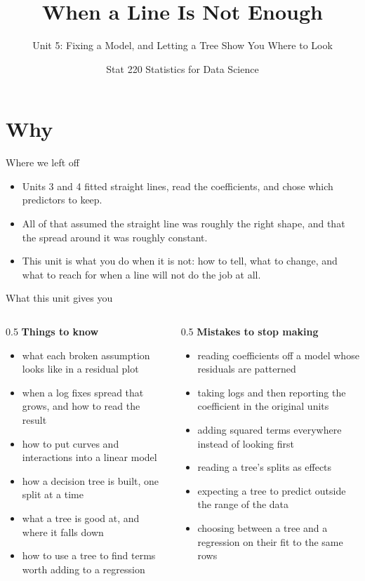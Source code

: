 \documentclass[aspectratio=169]{beamer}
\title{When a Line Is Not Enough}
\subtitle{Unit 5: Fixing a Model, and Letting a Tree Show You Where to Look}
\author{Stat 220 \textbar{} Statistics for Data Science}
\date{}
\begin{document}
\begin{frame}
  \titlepage
\end{frame}

\section{Why}
\begin{frame}{Where we left off}
\begin{itemize}
  \item Units 3 and 4 fitted straight lines, read the coefficients, and chose which predictors
        to keep.
  \item All of that assumed the straight line was roughly the right shape, and that the spread
        around it was roughly constant.
  \item This unit is what you do when it is not: how to tell, what to change, and what to reach
        for when a line will not do the job at all.
\end{itemize}
\end{frame}

\begin{frame}{What this unit gives you}
\begin{columns}[T]
\begin{column}{0.5\textwidth}
\textbf{Things to know}
\begin{itemize}\small
  \item what each broken assumption looks like in a residual plot
  \item when a log fixes spread that grows, and how to read the result
  \item how to put curves and interactions into a linear model
  \item how a decision tree is built, one split at a time
  \item what a tree is good at, and where it falls down
  \item how to use a tree to find terms worth adding to a regression
\end{itemize}
\end{column}
\begin{column}{0.5\textwidth}
\textbf{Mistakes to stop making}
\begin{itemize}\small
  \item reading coefficients off a model whose residuals are patterned
  \item taking logs and then reporting the coefficient in the original units
  \item adding squared terms everywhere instead of looking first
  \item reading a tree's splits as effects
  \item expecting a tree to predict outside the range of the data
  \item choosing between a tree and a regression on their fit to the same rows
\end{itemize}
\end{column}
\end{columns}
\end{frame}
\end{document}
